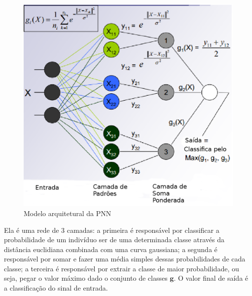 \begin{figure}[h]
	\centering
		\includegraphics[scale=0.7]{figuras/PNN.eps}
	\caption{Modelo arquitetural da PNN}
\end{figure}

Ela é uma rede de 3 camadas: a primeira é responsável por classificar a probabilidade de um indivíduo ser de uma determinada classe através da distância euclidiana combinada com uma curva gaussiana; a segunda é responsável por somar e fazer uma média simples dessas probabilidades de cada classe; a terceira é responsável por extrair a classe de maior probabilidade, ou seja, pegar o valor máximo dado o conjunto de classes $\textbf{g}$. O valor final de saída é a classificação do sinal de entrada.
